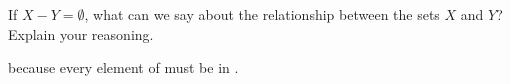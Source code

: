 \documentclass[nooutcomes]{ximera}
\begin{document}
\begin{problem}
If $X-Y =\emptyset$, what can we say about the relationship between the sets $X$ and $Y$? Explain your reasoning.

because every element of  must be in .
\end{problem}
\end{document}
